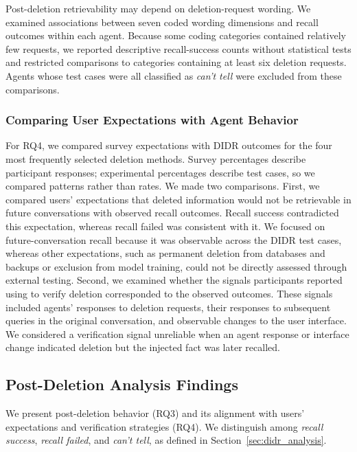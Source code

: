 \label{par:request_wording}
%
Post-deletion retrievability may depend on deletion-request wording.
%
We examined associations between seven coded wording dimensions and recall outcomes within each agent.
%
Because some coding categories contained relatively few requests, we reported descriptive recall-success counts without statistical tests and restricted comparisons to categories containing at least six deletion requests.
%
Agents whose test cases were all classified as \textit{can't tell} were excluded from these comparisons.



\subsubsection{Comparing User Expectations with Agent Behavior}
\label{sec:expectation_behavior}
%
For RQ4, we compared survey expectations with DIDR outcomes for the four most frequently selected deletion methods.
%
Survey percentages describe participant responses; experimental percentages describe test cases, so we compared patterns rather than rates.
%
We made two comparisons.
%
First, we compared users' expectations that deleted information would not be retrievable in future conversations with observed recall outcomes.
%
Recall success contradicted this expectation, whereas recall failed was consistent with it.
%
We focused on future-conversation recall because it was observable across the DIDR test cases, whereas other expectations, such as permanent deletion from databases and backups or exclusion from model training, could not be directly assessed through external testing.
%
Second, we examined whether the signals participants reported using to verify deletion corresponded to the observed outcomes.
%
These signals included agents' responses to deletion requests, their responses to subsequent queries in the original conversation, and observable changes to the user interface.
%
We considered a verification signal unreliable when an agent response or interface change indicated deletion but the injected fact was later recalled.



\subsection{Post-Deletion Analysis Findings}
\label{sec:tech_results}
%
We present post-deletion behavior (RQ3) and its alignment with users' expectations and verification strategies (RQ4).
%
We distinguish among \textit{recall success}, \textit{recall failed}, and \textit{can't tell}, as defined in Section~\ref{sec:didr_analysis}.


